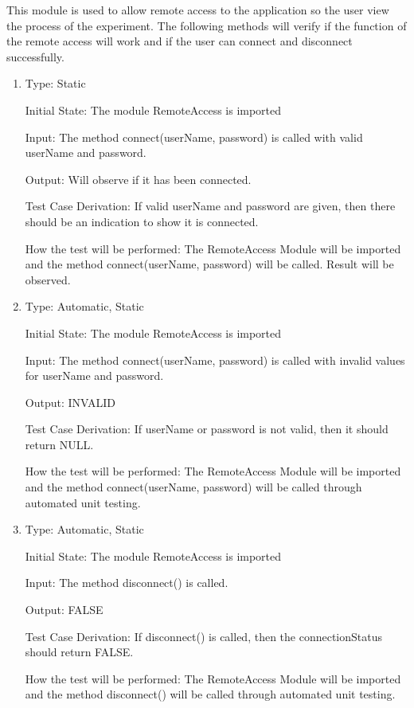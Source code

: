 \documentclass[12pt, titlepage]{article}
\begin{document}
This module is used to allow remote access to the application so the user view the process of the experiment. The following methods will verify if the function of the remote 
access will work and if the user can connect and disconnect successfully.
\begin{enumerate}[{UT-RA}1.]

  \item

  Type: Static
            
  Initial State: The module RemoteAccess is imported
            
  Input: The method connect(userName, password) is called with valid userName and password.
            
  Output: Will observe if it has been connected.
  
  Test Case Derivation: If valid userName and password are given, then there should be an indication to show it is connected.
  
  
  How the test will be performed: The RemoteAccess Module will be imported and the method connect(userName, password) will be called. Result will be observed.

  \item

  Type: Automatic, Static
            
  Initial State: The module RemoteAccess is imported
            
  Input: The method connect(userName, password) is called with invalid values for userName and password.
            
  Output: INVALID
  
  Test Case Derivation: If userName or password is not valid, then it should return NULL.
  
  
  How the test will be performed: The RemoteAccess Module will be imported and the method connect(userName, password) will be called through
  automated unit testing.

  \item

  Type: Automatic, Static
            
  Initial State: The module RemoteAccess is imported
            
  Input: The method disconnect() is called.
            
  Output: FALSE
  
  Test Case Derivation: If disconnect() is called, then the connectionStatus should return FALSE.
  
  
  How the test will be performed: The RemoteAccess Module will be imported and the method disconnect() will be called through
  automated unit testing.

\end{enumerate}
\end{document}
